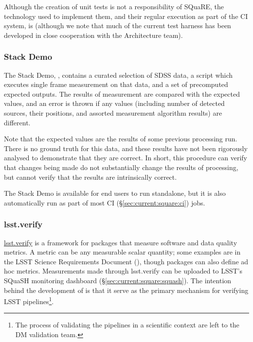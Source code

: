\documentclass[DM,authoryear,toc,lsstdraft]{lsstdoc}
\begin{document}
Although the creation of unit tests is not a responsibility of SQuaRE, the
technology used to implement them, and their regular execution as part of the
CI system, is (although we note that much of the current test harness has been
developed in close cooperation with the Architecture team).

\subsubsection{Stack Demo}
\label{sec:current:square:demo}

The Stack Demo, , contains a curated
selection of SDSS data, a script which executes single frame measurement on
that data, and a set of precomputed expected outputs. The results of
measurement are compared with the expected values, and an error is thrown if
any values (including number of detected sources, their positions, and
assorted measurement algorithm results) are different.

Note that the expected values are the results of some previous processing run.
There is no ground truth for this data, and these results have not been
rigorously analysed to demonstrate that they are correct. In short, this
procedure can verify that changes being made do not substantially change the
results of processing, but cannot verify that the results are intrinsically
correct.

The Stack Demo is available for end users to run standalone, but it is also
automatically run as part of most CI (\S\ref{sec:current:square:ci}) jobs.

\subsubsection{lsst.verify}
\label{sec:current:square:verify}


\href{https://github.com/lsst/verify}{lsst.verify} is a framework for packages
that measure software and data quality \glspl{metric}. A metric can be any
measurable scalar quantity; some examples are in the LSST Science Requirements
Document (), though packages can also define ad hoc metrics.
Measurements made through lsst.verify can be uploaded to LSST's SQuaSH
monitoring dashboard (\S\ref{sec:current:square:squash}). The intention behind
the development of  is that it serve as the primary
mechanism for verifying LSST pipelines\footnote{The process of validating the
pipelines in a scientific context are left to the DM validation team.}.
\end{document}
